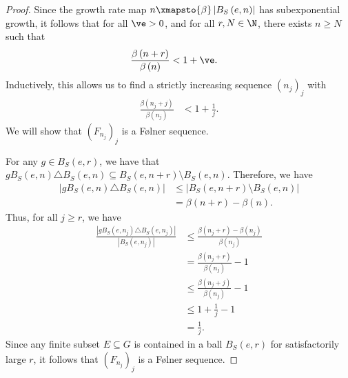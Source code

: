 \documentclass[10pt]{mypackage}
\begin{document}
\begin{proof}
  Since the growth rate map $n\xmapsto{\beta} \left\vert B_S\left( e,n \right) \right\vert$ has subexponential growth, it follows that for all $\ve > 0$, and for all $r,N\in \N$, there exists $n\geq N$ such that
  \begin{align*}
    \frac{\beta\left( n+r \right)}{\beta\left( n \right)} &< 1 + \ve.
  \end{align*}
  Inductively, this allows us to find a strictly increasing sequence $\left( n_j \right)_j$ with
  \begin{align*}
    \frac{\beta\left( n_j + j \right)}{\beta\left( n_j \right)} &< 1 + \frac{1}{j}.
  \end{align*}
  We will show that $\left( F_{n_j} \right)_{j}$ is a Følner sequence.

  For any $g\in B_S\left( e,r \right)$, we have that $gB_S\left( e,n \right)\triangle B_S\left( e,n \right) \subseteq B_S\left( e,n+r \right)\setminus B_S\left( e,n \right)$. Therefore, we have
  \begin{align*}
    \left\vert gB_S\left( e,n \right)\triangle B_S\left( e,n \right) \right\vert &\leq \left\vert B_S\left( e,n+r \right)\setminus B_S\left( e,n \right) \right\vert\\
                                                                                 &= \beta\left( n+r \right)-\beta\left( n \right).
  \end{align*}
  Thus, for all $j\geq r$, we have
  \begin{align*}
    \frac{\left\vert gB_S\left( e,n_j \right)\triangle B_S\left( e,n_j \right) \right\vert}{\left\vert B_S\left( e,n_j \right) \right\vert} &\leq \frac{\beta\left( n_j + r \right) - \beta\left( n_j \right)}{\beta\left( n_j \right)}\\
                                        &= \frac{\beta\left( n_j + r \right)}{\beta\left( n_j \right)} - 1\\
                                        &\leq \frac{\beta\left( n_j + j \right)}{\beta\left( n_j \right)} - 1\\
                                        &\leq 1 + \frac{1}{j} - 1\\
                                        &= \frac{1}{j}.
  \end{align*}
  Since any finite subset $E\subseteq G$ is contained in a ball $B_S\left( e,r \right)$ for satisfactorily large $r$, it follows that $\left( F_{n_j} \right)_j$ is a Følner sequence.
\end{proof}
\end{document}
